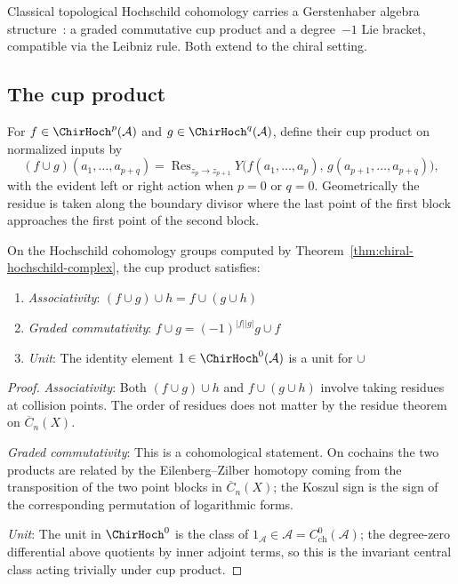Classical topological Hochschild cohomology carries a Gerstenhaber algebra structure~\cite{Ger63}: a graded commutative cup product and a degree~$-1$ Lie bracket, compatible via the Leibniz rule. Both extend to the chiral setting.

\subsection{The cup product}

\begin{definition}
For $f \in \ChirHoch^p(\mathcal{A})$ and
$g \in \ChirHoch^q(\mathcal{A})$, define their cup product
on normalized inputs by
\[
(f \cup g)(a_1,\ldots,a_{p+q})
= \operatorname{Res}_{z_p \to z_{p+1}}
Y\bigl(f(a_1,\ldots,a_p),\,g(a_{p+1},\ldots,a_{p+q})\bigr),
\]
with the evident left or right action when $p=0$ or $q=0$.
Geometrically the residue is taken along the boundary divisor where
the last point of the first block approaches the first point of the
second block.
\end{definition}

\begin{proposition}
\label{prop:cup-product-properties}
On the Hochschild cohomology groups computed by
Theorem~\textup{\ref{thm:chiral-hochschild-complex}}, the cup
product satisfies:
\begin{enumerate}
\item \emph{Associativity}: $(f \cup g) \cup h = f \cup (g \cup h)$
\item \emph{Graded commutativity}: $f \cup g = (-1)^{|f||g|} g \cup f$
\item \emph{Unit}: The identity element $1 \in \ChirHoch^0(\mathcal{A})$ is a unit for $\cup$
\end{enumerate}
\end{proposition}

\begin{proof}
\emph{Associativity}: Both $(f \cup g) \cup h$ and $f \cup (g \cup h)$ involve taking residues at collision points. The order of residues does not matter by the residue theorem on $\overline{C}_{n}(X)$.

\emph{Graded commutativity}: This is a cohomological statement.  On
cochains the two products are related by the Eilenberg--Zilber
homotopy coming from the transposition of the two point blocks in
$\overline{C}_n(X)$; the Koszul sign is the sign of the corresponding
permutation of logarithmic forms.

\emph{Unit}: The unit in $\ChirHoch^0$ is the class of
$1_{\mathcal A}\in\mathcal A=C^0_{\mathrm{ch}}(\mathcal A)$; the
degree-zero differential above quotients by inner adjoint terms, so
this is the invariant central class acting trivially under cup
product. \qedhere
\end{proof}

